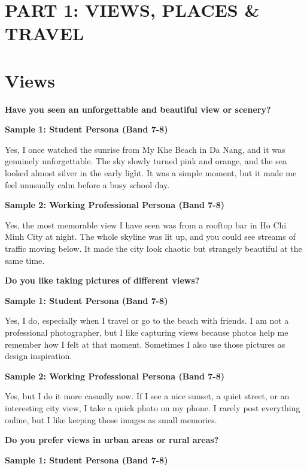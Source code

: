 \newpage

\section*{PART 1: VIEWS, PLACES \& TRAVEL}

\section{Views}
\begin{ieltsquestion}
\textbf{Have you seen an unforgettable and beautiful view or scenery?}
\end{ieltsquestion}
\textbf{Sample 1: Student Persona (Band 7-8)}

Yes, I once watched the sunrise from My Khe Beach in Da Nang, and it was genuinely unforgettable. The sky slowly turned pink and orange, and the sea looked almost silver in the early light. It was a simple moment, but it made me feel unusually calm before a busy school day.

\textbf{Sample 2: Working Professional Persona (Band 7-8)}

Yes, the most memorable view I have seen was from a rooftop bar in Ho Chi Minh City at night. The whole skyline was lit up, and you could see streams of traffic moving below. It made the city look chaotic but strangely beautiful at the same time.

\separator

\begin{ieltsquestion}
\textbf{Do you like taking pictures of different views?}
\end{ieltsquestion}
\textbf{Sample 1: Student Persona (Band 7-8)}

Yes, I do, especially when I travel or go to the beach with friends. I am not a professional photographer, but I like capturing views because photos help me remember how I felt at that moment. Sometimes I also use those pictures as design inspiration.

\textbf{Sample 2: Working Professional Persona (Band 7-8)}

Yes, but I do it more casually now. If I see a nice sunset, a quiet street, or an interesting city view, I take a quick photo on my phone. I rarely post everything online, but I like keeping those images as small memories.

\separator

\begin{ieltsquestion}
\textbf{Do you prefer views in urban areas or rural areas?}
\end{ieltsquestion}
\textbf{Sample 1: Student Persona (Band 7-8)}

